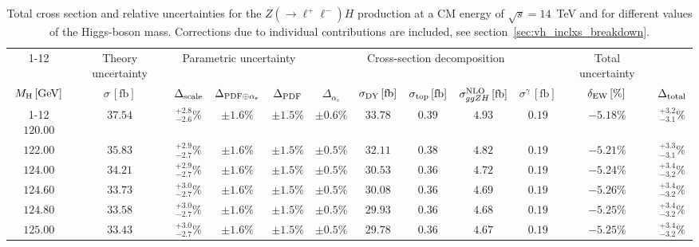 \begin{landscape}
\begin{table}[ht!]
\caption{Total cross section and relative uncertainties for the $Z ( \rightarrow \ell^+ \ell^-) H$ production at a CM energy of  $\sqrt{s}=14$~TeV and for different values of the Higgs-boson mass. Corrections due to individual contributions are included, see section~\ref{sec:vh_inclxs_breakdown}.}
\label{tab:zh_lep_xs_14tev}
\centering
\scriptsize
{\renewcommand{\arraystretch}{1.4}
\begin{tabular}{| cc | c | ccc | ccccc | c |}
\cline{1-12}
\multicolumn{2}{|c|}{\(\sqrt{s} = 14\,\mathrm{TeV}\)} &
\multicolumn{1}{|c|}{Theory uncertainty} &
\multicolumn{3}{|c|}{Parametric uncertainty} &
\multicolumn{5}{|c|}{Cross-section decomposition} &
\multicolumn{1}{c|}{Total uncertainty} \\
\(M_\mathrm{H}\,[\mathrm{GeV}]\) & \(\sigma\,[\mathrm{fb}]\) &
\(\Delta_{\rm scale}\) &
\(\Delta_{\rm PDF\oplus\alpha_s}\) &
{\color{black!55}\(\Delta_{\rm PDF}\)} & {\color{black!55}\(\Delta_{\alpha_s}\)} &
\(\sigma_{\rm DY}\,[\mathrm{fb}]\) & \(\sigma_{\rm top}\,[\mathrm{fb}]\) & \(\sigma^{\rm NLO}_{ggZH}\,[\mathrm{fb}]\) & \(\sigma^\gamma\,[\mathrm{fb}]\) & \(\delta_{\rm EW}\,[\%]\) &
\(\Delta_{\rm total}\)
\\
\cline{1-12}
$120.00$ & $37.54$ & $^{+2.8}_{-2.6}\%$ & $\pm 1.6\%$ & {\color{black!55}$\pm 1.5\%$} & {\color{black!55}$\pm 0.6\%$} & $33.78$ & $0.39$ & $4.93$ & $0.19$ & $-5.18\%$ & $^{+3.2}_{-3.1}\%$ \\
$122.00$ & $35.83$ & $^{+2.9}_{-2.7}\%$ & $\pm 1.6\%$ & {\color{black!55}$\pm 1.5\%$} & {\color{black!55}$\pm 0.5\%$} & $32.11$ & $0.38$ & $4.82$ & $0.19$ & $-5.21\%$ & $^{+3.3}_{-3.1}\%$ \\
$124.00$ & $34.21$ & $^{+2.9}_{-2.7}\%$ & $\pm 1.6\%$ & {\color{black!55}$\pm 1.5\%$} & {\color{black!55}$\pm 0.5\%$} & $30.53$ & $0.36$ & $4.72$ & $0.19$ & $-5.24\%$ & $^{+3.4}_{-3.2}\%$ \\
$124.60$ & $33.73$ & $^{+3.0}_{-2.7}\%$ & $\pm 1.6\%$ & {\color{black!55}$\pm 1.5\%$} & {\color{black!55}$\pm 0.5\%$} & $30.08$ & $0.36$ & $4.69$ & $0.19$ & $-5.26\%$ & $^{+3.4}_{-3.2}\%$ \\
$124.80$ & $33.58$ & $^{+3.0}_{-2.7}\%$ & $\pm 1.6\%$ & {\color{black!55}$\pm 1.5\%$} & {\color{black!55}$\pm 0.5\%$} & $29.93$ & $0.36$ & $4.68$ & $0.19$ & $-5.25\%$ & $^{+3.4}_{-3.2}\%$ \\
$125.00$ & $33.43$ & $^{+3.0}_{-2.7}\%$ & $\pm 1.6\%$ & {\color{black!55}$\pm 1.5\%$} & {\color{black!55}$\pm 0.5\%$} & $29.78$ & $0.36$ & $4.67$ & $0.19$ & $-5.25\%$ & $^{+3.4}_{-3.2}\%$ \\

\end{tabular}}
\end{table}
\end{landscape}

